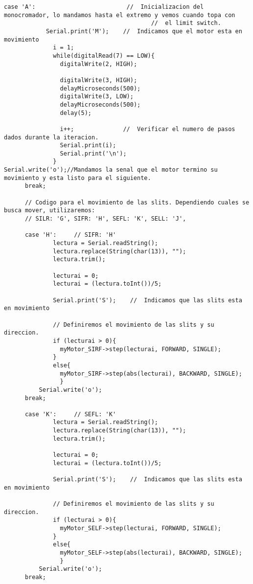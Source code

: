 \begin{lstlisting}[style=Arduino]
       case 'A':                          //  Inicializacion del monocromador, lo mandamos hasta el extremo y vemos cuando topa con
                                          //  el limit switch.
            Serial.print('M');    //  Indicamos que el motor esta en movimiento
              i = 1;
              while(digitalRead(7) == LOW){
                digitalWrite(2, HIGH);
         
                digitalWrite(3, HIGH);
                delayMicroseconds(500);
                digitalWrite(3, LOW);
                delayMicroseconds(500);
                delay(5);
    
                i++;              //  Verificar el numero de pasos dados durante la iteracion.
                Serial.print(i);
                Serial.print('\n');
              }
Serial.write('o');//Mandamos la senal que el motor termino su movimiento y esta listo para el siguiente.
      break;
    
      // Codigo para el movimiento de las slits. Dependiendo cuales se busca mover, utilizaremos:
      // SILR: 'G', SIFR: 'H', SEFL: 'K', SELL: 'J', 
    
      case 'H':     // SIFR: 'H'
              lectura = Serial.readString();
              lectura.replace(String(char(13)), "");
              lectura.trim();
              
              lecturai = 0;
              lecturai = (lectura.toInt())/5;
              
              Serial.print('S');    //  Indicamos que las slits esta en movimiento
              
              // Definiremos el movimiento de las slits y su direccion.
              if (lecturai > 0){
                myMotor_SIRF->step(lecturai, FORWARD, SINGLE);
              }
              else{
                myMotor_SIRF->step(abs(lecturai), BACKWARD, SINGLE);
                }
          Serial.write('o');
      break;
    
      case 'K':     // SEFL: 'K'
              lectura = Serial.readString();
              lectura.replace(String(char(13)), "");
              lectura.trim();
              
              lecturai = 0;
              lecturai = (lectura.toInt())/5;
              
              Serial.print('S');    //  Indicamos que las slits esta en movimiento
              
              // Definiremos el movimiento de las slits y su direccion.
              if (lecturai > 0){
                myMotor_SELF->step(lecturai, FORWARD, SINGLE);
              }
              else{
                myMotor_SELF->step(abs(lecturai), BACKWARD, SINGLE);
                }
          Serial.write('o');
      break;
    

\end{lstlisting}

